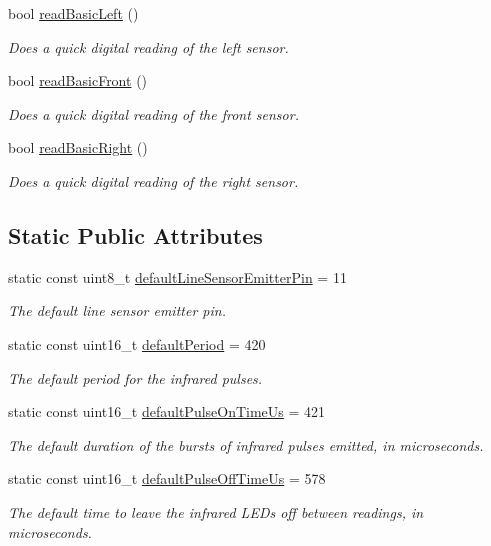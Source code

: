 \begin{DoxyCompactItemize}
bool \hyperlink{class_zumo32_u4_proximity_sensors_a7d72d0576fa21327d6295b61b61f88f6}{read\+Basic\+Left} ()
\begin{DoxyCompactList}\small\item\em Does a quick digital reading of the left sensor. \end{DoxyCompactList}\item 
bool \hyperlink{class_zumo32_u4_proximity_sensors_a6394e540d0bd14ad9b2637d0772fff5c}{read\+Basic\+Front} ()
\begin{DoxyCompactList}\small\item\em Does a quick digital reading of the front sensor. \end{DoxyCompactList}\item 
bool \hyperlink{class_zumo32_u4_proximity_sensors_a727ec0d918736c55dfb58c4495bad068}{read\+Basic\+Right} ()
\begin{DoxyCompactList}\small\item\em Does a quick digital reading of the right sensor. \end{DoxyCompactList}\end{DoxyCompactItemize}
\subsection*{Static Public Attributes}
\begin{DoxyCompactItemize}
\item 
static const uint8\+\_\+t \hyperlink{class_zumo32_u4_proximity_sensors_a7d6a79ab499972b36c52d2a8c03fe0f7}{default\+Line\+Sensor\+Emitter\+Pin} = 11
\begin{DoxyCompactList}\small\item\em The default line sensor emitter pin. \end{DoxyCompactList}\item 
static const uint16\+\_\+t \hyperlink{class_zumo32_u4_proximity_sensors_a0857da91ca57c4f884094736bd1c0824}{default\+Period} = 420
\begin{DoxyCompactList}\small\item\em The default period for the infrared pulses. \end{DoxyCompactList}\item 
static const uint16\+\_\+t \hyperlink{class_zumo32_u4_proximity_sensors_a6d47a41b45a7088916fbeaa5b38c60b3}{default\+Pulse\+On\+Time\+Us} = 421
\begin{DoxyCompactList}\small\item\em The default duration of the bursts of infrared pulses emitted, in microseconds. \end{DoxyCompactList}\item 
static const uint16\+\_\+t \hyperlink{class_zumo32_u4_proximity_sensors_a60fcba68f8cc7f2710f32ac76de85cdf}{default\+Pulse\+Off\+Time\+Us} = 578
\begin{DoxyCompactList}\small\item\em The default time to leave the infrared L\+E\+Ds off between readings, in microseconds. \end{DoxyCompactList}\end{DoxyCompactItemize}


